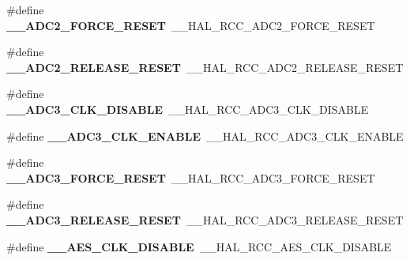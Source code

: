\begin{DoxyCompactItemize}
\#define {\bfseries \+\_\+\+\_\+\+A\+D\+C2\+\_\+\+F\+O\+R\+C\+E\+\_\+\+R\+E\+S\+ET}~\+\_\+\+\_\+\+H\+A\+L\+\_\+\+R\+C\+C\+\_\+\+A\+D\+C2\+\_\+\+F\+O\+R\+C\+E\+\_\+\+R\+E\+S\+ET
\item 
\mbox{\label{group___h_a_l___r_c_c___aliased_ga950dedd481bcb1024279b78abc7f80d9}} 
\#define {\bfseries \+\_\+\+\_\+\+A\+D\+C2\+\_\+\+R\+E\+L\+E\+A\+S\+E\+\_\+\+R\+E\+S\+ET}~\+\_\+\+\_\+\+H\+A\+L\+\_\+\+R\+C\+C\+\_\+\+A\+D\+C2\+\_\+\+R\+E\+L\+E\+A\+S\+E\+\_\+\+R\+E\+S\+ET
\item 
\mbox{\label{group___h_a_l___r_c_c___aliased_ga05c6b7d579c500a86114a5e70421e154}} 
\#define {\bfseries \+\_\+\+\_\+\+A\+D\+C3\+\_\+\+C\+L\+K\+\_\+\+D\+I\+S\+A\+B\+LE}~\+\_\+\+\_\+\+H\+A\+L\+\_\+\+R\+C\+C\+\_\+\+A\+D\+C3\+\_\+\+C\+L\+K\+\_\+\+D\+I\+S\+A\+B\+LE
\item 
\mbox{\label{group___h_a_l___r_c_c___aliased_ga96ef8d5f9623cc70e65c86d0806e3e86}} 
\#define {\bfseries \+\_\+\+\_\+\+A\+D\+C3\+\_\+\+C\+L\+K\+\_\+\+E\+N\+A\+B\+LE}~\+\_\+\+\_\+\+H\+A\+L\+\_\+\+R\+C\+C\+\_\+\+A\+D\+C3\+\_\+\+C\+L\+K\+\_\+\+E\+N\+A\+B\+LE
\item 
\mbox{\label{group___h_a_l___r_c_c___aliased_gad312edcb949947577c55a2d45a9518ac}} 
\#define {\bfseries \+\_\+\+\_\+\+A\+D\+C3\+\_\+\+F\+O\+R\+C\+E\+\_\+\+R\+E\+S\+ET}~\+\_\+\+\_\+\+H\+A\+L\+\_\+\+R\+C\+C\+\_\+\+A\+D\+C3\+\_\+\+F\+O\+R\+C\+E\+\_\+\+R\+E\+S\+ET
\item 
\mbox{\label{group___h_a_l___r_c_c___aliased_ga7a8f6b458fbba95a8649e1989b58eaf5}} 
\#define {\bfseries \+\_\+\+\_\+\+A\+D\+C3\+\_\+\+R\+E\+L\+E\+A\+S\+E\+\_\+\+R\+E\+S\+ET}~\+\_\+\+\_\+\+H\+A\+L\+\_\+\+R\+C\+C\+\_\+\+A\+D\+C3\+\_\+\+R\+E\+L\+E\+A\+S\+E\+\_\+\+R\+E\+S\+ET
\item 
\mbox{\label{group___h_a_l___r_c_c___aliased_gafed074f52db05d4c07cf496232bb3153}} 
\#define {\bfseries \+\_\+\+\_\+\+A\+E\+S\+\_\+\+C\+L\+K\+\_\+\+D\+I\+S\+A\+B\+LE}~\+\_\+\+\_\+\+H\+A\+L\+\_\+\+R\+C\+C\+\_\+\+A\+E\+S\+\_\+\+C\+L\+K\+\_\+\+D\+I\+S\+A\+B\+LE
\item 
\mbox{\label{group___h_a_l___r_c_c___aliased_ga0c5aad08bba28d384dc7e1181fee6b67}} 

\end{DoxyCompactItemize}
